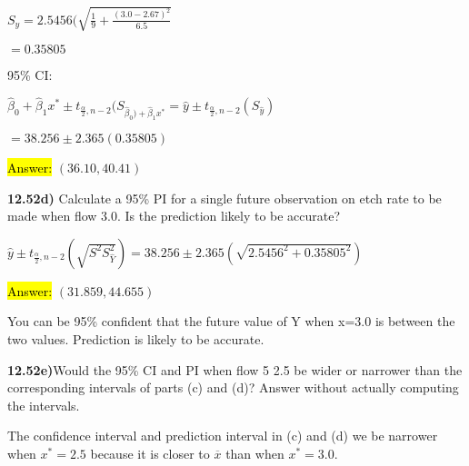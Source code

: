 \documentclass{article}
\begin{document}
$S_{\hat{y}}=2.5456(\sqrt{\frac{1}{9}+\frac{(3.0-2.67)^{2}}{6.5}}$

\vspace{2mm}

$=0.35805$


95\% CI:

\vspace{2mm}

$\hat{\beta}_{0}+\hat{\beta}_{1}x^{*} \pm t_{\frac{\alpha}{2},n-2}(S_{\hat{\beta}_{0})+\hat{\beta}_{1}x^{*}}=\hat{y} \pm t_{\frac{\alpha}{2},n-2}(S_{\hat{y}})$

$=38.256 \pm 2.365(0.35805)$

\vspace{2mm}

\hl{Answer:}  $(36.10, 40.41)$








\vspace{5mm}

\textbf{12.52d)} Calculate a 95\% PI for a single future observation on etch rate to be made when flow  3.0. Is the prediction likely to be accurate?

\vspace{2mm}

$\hat{y} \pm t_{\frac{\alpha}{2},n-2}(\sqrt{S^{2}S^{2}_{\hat{Y}}})=38.256 \pm 2.365(\sqrt{2.5456^{2}+0.35805^{2}})$

\vspace{2mm}

\hl{Answer:}  $(31.859, 44.655)$

\vspace{2mm}

You can be 95\% confident that the future value of Y when x=3.0 is between the two values. Prediction is likely to be accurate. 



\vspace{5mm}

\textbf{12.52e)}Would the 95\% CI and PI when flow 5 2.5 be wider or narrower than the corresponding intervals of parts (c) and (d)? Answer without actually computing the intervals.

\vspace{2mm}

The confidence interval and prediction interval in (c) and (d) we be narrower when $x^{*}=2.5$ because it is closer to $\overline{x}$ than when $x^{*}=3.0$. 
\end{document}

